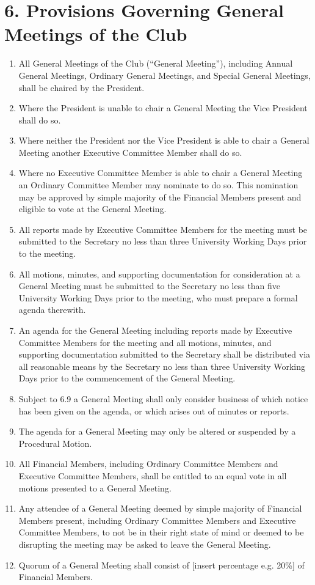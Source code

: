 \documentclass[12pt]{article}
\begin{document}
\section{6. Provisions Governing General Meetings of the Club}
\begin{enumerate}[label=6.\arabic*]
\item All General Meetings of the Club (“General Meeting”), including Annual General Meetings, Ordinary General Meetings, and Special General Meetings, shall be chaired by the President.
\item Where the President is unable to chair a General Meeting the Vice President shall do so.
\item Where neither the President nor the Vice President is able to chair a General Meeting another Executive Committee Member shall do so.
\item Where no Executive Committee Member is able to chair a General Meeting an Ordinary Committee Member may nominate to do so. This nomination may be approved by simple majority of the Financial Members present and eligible to vote at the General Meeting.
\item All reports made by Executive Committee Members for the meeting must be submitted to the Secretary no less than three University Working Days prior to the meeting.
\item All motions, minutes, and supporting documentation for consideration at a General Meeting must be submitted to the Secretary no less than five University Working Days prior to the meeting, who must prepare a formal agenda therewith.
\item An agenda for the General Meeting including reports made by Executive Committee Members for the meeting and all motions, minutes, and supporting documentation submitted to the Secretary shall be distributed via all reasonable means by the Secretary no less than three University Working Days prior to the commencement of the General Meeting.
\item Subject to 6.9 a General Meeting shall only consider business of which notice has been given on the agenda, or which arises out of minutes or reports.
\item The agenda for a General Meeting may only be altered or suspended by a Procedural Motion.
\item All Financial Members, including Ordinary Committee Members and Executive Committee Members, shall be entitled to an equal vote in all motions presented to a General Meeting.
\item Any attendee of a General Meeting deemed by simple majority of Financial Members present, including Ordinary Committee Members and Executive Committee Members, to not be in their right state of mind or deemed to be disrupting the meeting may be asked to leave the General Meeting.
\item Quorum of a General Meeting shall consist of [insert percentage e.g. 20\%] of Financial Members.
\end{enumerate}
\end{document}
